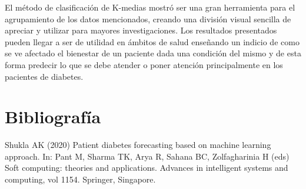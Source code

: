 \documentclass{article}
\begin{document}
El método de clasificación de K-medias mostró ser una gran herramienta para el agrupamiento de los datos mencionados, creando una división visual sencilla de apreciar y utilizar para mayores investigaciones. Los resultados presentados pueden llegar a ser de utilidad en ámbitos de salud enseñando un indicio de como se ve afectado el bienestar de un paciente dada una condición del mismo y de esta forma predecir lo que se debe atender o poner atención principalmente en los pacientes de diabetes. 

\section*{Bibliografía}
Shukla AK (2020) Patient diabetes forecasting based on machine learning approach. In: Pant M, Sharma TK, Arya R, Sahana BC, Zolfagharinia H (eds) Soft computing: theories and applications. Advances in intelligent systems and computing, vol 1154. Springer, Singapore.
\end{document}
